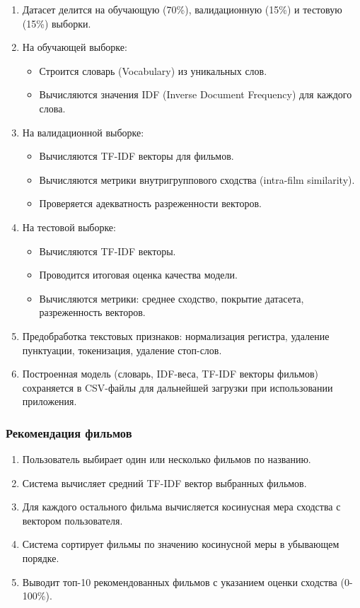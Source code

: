 \begin{enumerate}
    \item Датасет делится на обучающую (70\%), валидационную (15\%) и тестовую (15\%) выборки.
    
    \item На обучающей выборке:
    \begin{itemize}
        \item Строится словарь (Vocabulary) из уникальных слов.
        \item Вычисляются значения IDF (Inverse Document Frequency) для каждого слова.
    \end{itemize}
    
    \item На валидационной выборке:
    \begin{itemize}
        \item Вычисляются TF-IDF векторы для фильмов.
        \item Вычисляются метрики внутригруппового сходства (intra-film similarity).
        \item Проверяется адекватность разреженности векторов.
    \end{itemize}
    
    \item На тестовой выборке:
    \begin{itemize}
        \item Вычисляются TF-IDF векторы.
        \item Проводится итоговая оценка качества модели.
        \item Вычисляются метрики: среднее сходство, покрытие датасета, разреженность векторов.
    \end{itemize}
    
    \item Предобработка текстовых признаков: нормализация регистра, удаление пунктуации, 
    токенизация, удаление стоп-слов.
    
    \item Построенная модель (словарь, IDF-веса, TF-IDF векторы фильмов) сохраняется 
    в CSV-файлы для дальнейшей загрузки при использовании приложения.
\end{enumerate}

\subsubsection*{Рекомендация фильмов}

\begin{enumerate}
    \item Пользователь выбирает один или несколько фильмов по названию.
    \item Система вычисляет средний TF-IDF вектор выбранных фильмов.
    \item Для каждого остального фильма вычисляется косинусная мера сходства с вектором пользователя.
    \item Система сортирует фильмы по значению косинусной меры в убывающем порядке.
    \item Выводит топ-10 рекомендованных фильмов с указанием оценки сходства (0-100\%).
\end{enumerate}

